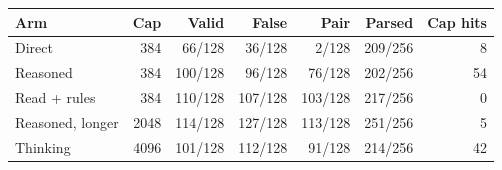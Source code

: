 \begin{tabular}{lrrrrrr}
\toprule
Arm & Cap & Valid & False & Pair & Parsed & Cap hits \\
\midrule
Direct & 384 & 66/128 & 36/128 & 2/128 & 209/256 & 8 \\
Reasoned & 384 & 100/128 & 96/128 & 76/128 & 202/256 & 54 \\
Read + rules & 384 & 110/128 & 107/128 & 103/128 & 217/256 & 0 \\
Reasoned, longer & 2048 & 114/128 & 127/128 & 113/128 & 251/256 & 5 \\
Thinking & 4096 & 101/128 & 112/128 & 91/128 & 214/256 & 42 \\
\bottomrule
\end{tabular}
